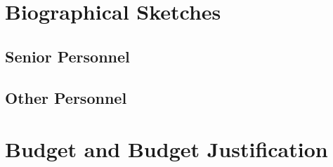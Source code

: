 \documentclass[hidelinks,11pt]{article}
\begin{document}


\pagebreak
\section{ Biographical Sketches }

\subsection{ Senior Personnel }

\subsection{ Other Personnel }

\section{ Budget and Budget Justification  }
\end{document}
